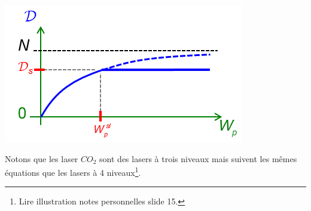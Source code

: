 \begin{center}
	\includegraphics[scale=0.6]{ch4/image8.png}
\end{center}

Notons que les laser $CO_2$ sont des lasers à trois niveaux mais suivent les mêmes équations que les
lasers à 4 niveaux\footnote{Lire illustration notes personnelles slide 15.}.

\newpage
